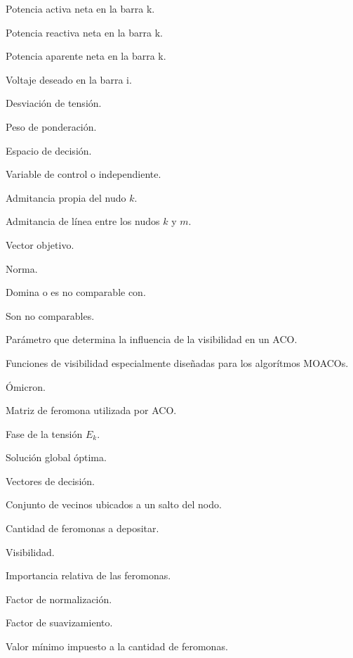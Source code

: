\begin{Nomencl}[2em]
\item[$P_k        $] Potencia activa neta en la barra k.
\item[$Q_k        $] Potencia reactiva neta en la barra k.
\item[$S_k        $] Potencia aparente neta en la barra k.
\item[${V_i}^*        $] Voltaje deseado en la barra i.
\item[$\Delta V        $] Desviaci\'on de tensi\'on.
\item[$w_j        $] Peso de ponderaci\'on.
\item[$\textbf{X}        $] Espacio de decisi\'on.
\item[$\textbf{x} \in \mathbb{R}^n$] Variable de control o independiente.
\item[$Y_{kk}$] Admitancia propia del nudo $k$.
\item[$y_{km}$] Admitancia de l\'inea entre los nudos $k$ y $m$.
\item[$\textbf{y}$] Vector objetivo.
\item[$||.||$] Norma.
\item[$\triangleright$] Domina o es no comparable con.
\item[$\sim$] Son no comparables.
\item[$\beta$] Par\'ametro que determina la influencia de la visibilidad en un ACO.
\item[$\eta_1, \eta_2, \eta_3$] Funciones de visibilidad especialmente dise\~nadas para los
    algor\'itmos MOACOs.
\item[$O$] Ómicron.
\item[$\tau        $] Matriz de feromona utilizada por ACO.
\item[$\theta_k        $] Fase de la tensi\'on $E_k$.
\item[$x^*        $] Soluci\'on global \'optima.
\item[$u,v,x        $] Vectores de decisi\'on.
\item[$J_i        $] Conjunto de vecinos ubicados a un salto del nodo.
\item[$\Delta \tau        $] Cantidad de feromonas a depositar.
\item[$\eta        $] Visibilidad.
\item[$\alpha        $] Importancia relativa de las feromonas.
\item[$Z        $] Factor de normalizaci\'on.
\item[$f_s        $] Factor de suavizamiento.
\item[$\tau_{min}        $] Valor m\'inimo impuesto a la cantidad de feromonas.

\end{Nomencl}

